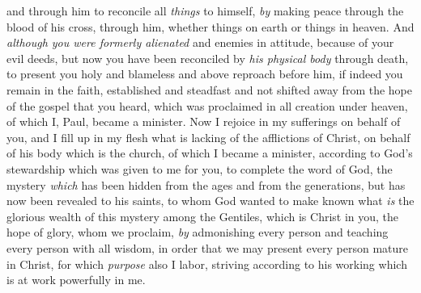 \begin{biblechapter}
\verse and through him to reconcile all \textit{things} to himself, \textit{by} making peace through the blood of his cross, through him, whether things on earth or things in heaven.
\verse And \textit{although you were formerly alienated} and enemies in attitude, because of your evil deeds,
\verse but now you have been reconciled by \textit{his physical body} through death, to present you holy and blameless and above reproach before him,
\verse if indeed you remain in the faith, established and steadfast and not shifted away from the hope of the gospel that you heard, which was proclaimed in all creation under heaven, of which I, Paul, became a minister.
 Now I rejoice in my sufferings on behalf of you, and I fill up in my flesh what is lacking of the afflictions of Christ, on behalf of his body which is the church,
\verse of which I became a minister, according to God’s stewardship which was given to me for you, to complete the word of God,
\verse the mystery \textit{which} has been hidden from the ages and from the generations, but has now been revealed to his saints,
\verse to whom God wanted to make known what \textit{is} the glorious wealth of this mystery among the Gentiles, which is Christ in you, the hope of glory,
\verse whom we proclaim, \textit{by} admonishing every person and teaching every person with all wisdom, in order that we may present every person mature in Christ,
\verse for which \textit{purpose} also I labor, striving according to his working which is at work powerfully in me.
\end{biblechapter}

